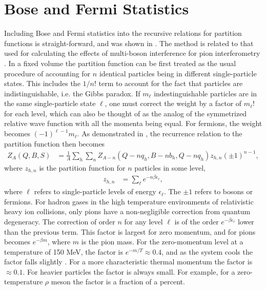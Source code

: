 
\section{Bose and Fermi Statistics}\label{sec:bose}

Including Bose and Fermi statistics into the recursive relations for partition functions is straight-forward, and was shown in \cite{Cheng:2002jb,Pratt:1999ns}. The method is related to that used for calculating the effects of multi-boson interference for pion interferometry \cite{Pratt:1993uy}. In a fixed volume the partition function can be first treated as the usual procedure of accounting for $n$ identical particles being in different single-particle states. This includes the $1/n!$ term to account for the fact that particles are indistinguishable, i.e. the Gibbs paradox. If $m_\ell$ indestinguishable particles are in the same single-particle state $\ell$, one must correct the weight by a factor of $m_\ell!$ for each level, which can also be thought of as the analog of the symmetrized relative wave function with all the momenta being equal. For fermions, the weight becomes $(-1)^{\ell-1}m_\ell$. As demonstrated in \cite{Pratt:1999ns}, the recurrence relation to the partition function then becomes
\begin{eqnarray}\label{eq:Zbf}
Z_{A}(Q,B,S)&=\frac{1}{A}\sum_h \sum_n Z_{A-n}(Q-nq_h,B-nb_h,Q-nq_h)z_{h,n}(\pm 1)^{n-1},
\end{eqnarray}
where $z_{h,n}$ is the partition function for $n$ particles in some level, 
\begin{eqnarray}
z_{h,n}&=\sum_\ell e^{-n\beta \epsilon_\ell},
\end{eqnarray}
where $\ell$ refers to single-particle levels of energy $\epsilon_\ell$. The $\pm 1$ refers to bosons or fermions. For hadron gases in the high temperature environments of relativistic heavy ion collisions, only pions have a non-negligible correction from quantum degeneracy. The correction of order $n$ for any level $\ell$ is of the order $e^{-\beta \epsilon_\ell}$ lower than the previous term. This factor is largest for zero momentum, and for pions becomes $e^{-\beta m}$, where $m$ is the pion mass. For the zero-momentum level at a temperature of 150 MeV, the factor is $e^{-m/T}\approx 0.4$, and as the system cools the factor falls slightly \cite{Greiner:1993jn}. For a more characteristic thermal momentum the factor is $\approx 0.1$. For heavier particles the factor is always small. For example, for a zero-temperature $\rho$ meson the factor is a fraction of a percent.

